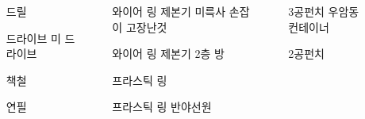 \documentclass[20pt, a1paper ]{tikzposter}
\begin{document}
\begin{columns}
{		}		




		{
			\setlength{\leftmargini}{7em}			
			\setlength{\labelsep}{1em} %

			\begin{large}
			\begin{itemize}
			\item [드릴]
			\item [드라이브] 미 드라이브 
			\item [책철] 
			\item [연필] 
			\end{itemize}
			\end{large}

		}



			{				
			\setlength{\leftmargini}{12em}
			\setlength{\labelsep}{1em} %

			\begin{large}
			\begin{itemize}
			\item [와이어 링 제본기] 미륵사 손잡이 고장난것
			\item [와이어 링 제본기] 2층 방
			\item [프라스틱 링]
			\item [프라스틱 링] 반야선원
			\end{itemize}
			\end{large}
		}

			{				
			\setlength{\leftmargini}{12em}
			\setlength{\labelsep}{1em} %

			\begin{large}
			\begin{itemize}
			\item [3공펀치] 우암동 컨테이너 
			\item [2공펀치]
			\end{itemize}
			\end{large}
		}


\end{columns}
\end{document}
